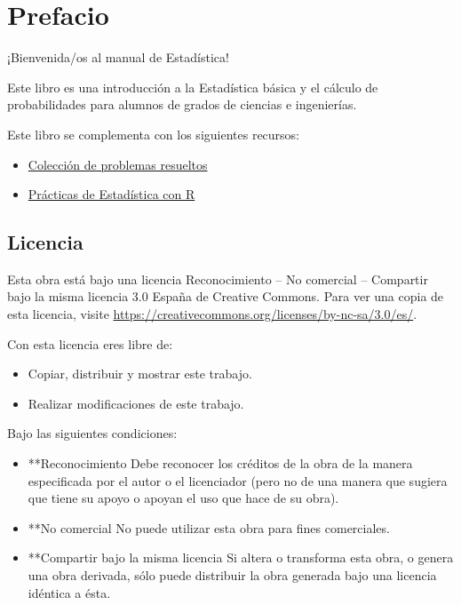 \documentclass[
  a4paper,
]{scrreport}
\providecommand{\tightlist}{%
  \setlength{\itemsep}{0pt}\setlength{\parskip}{0pt}}\usepackage{longtable,booktabs,array}
\renewcommand*\contentsname{Indice de contenidos}
\newcommand\contentsname{Indice de contenidos}
\theoremstyle{plain}
\theoremstyle{definition}
\theoremstyle{definition}
\theoremstyle{remark}
\begin{document}
\renewcommand*\contentsname{Indice de contenidos}
{
\hypersetup{linkcolor=}
\setcounter{tocdepth}{2}
\tableofcontents
}

\hypertarget{prefacio}{%
\chapter*{Prefacio}\label{prefacio}}


¡Bienvenida/os al manual de Estadística!

Este libro es una introducción a la Estadística básica y el cálculo de
probabilidades para alumnos de grados de ciencias e ingenierías.

Este libro se complementa con los siguientes recursos:

\begin{itemize}
\tightlist
\item
  \href{https://aprendeconalf.es/estadistica-ejercicios/}{Colección de
  problemas resueltos}
\item
  \href{https://aprendeconalf.es/estadistica-practicas-r/}{Prácticas de
  Estadística con R}
\end{itemize}

\hypertarget{licencia}{%
\section*{Licencia}\label{licencia}}


Esta obra está bajo una licencia Reconocimiento -- No comercial --
Compartir bajo la misma licencia 3.0 España de Creative Commons. Para
ver una copia de esta licencia, visite
\url{https://creativecommons.org/licenses/by-nc-sa/3.0/es/}.

Con esta licencia eres libre de:

\begin{itemize}
\tightlist
\item
  Copiar, distribuir y mostrar este trabajo.
\item
  Realizar modificaciones de este trabajo.
\end{itemize}

Bajo las siguientes condiciones:

\begin{itemize}
\item
  **Reconocimiento Debe reconocer los créditos de la obra de la manera
  especificada por el autor o el licenciador (pero no de una manera que
  sugiera que tiene su apoyo o apoyan el uso que hace de su obra).
\item
  **No comercial No puede utilizar esta obra para fines comerciales.
\item
  **Compartir bajo la misma licencia Si altera o transforma esta obra, o
  genera una obra derivada, sólo puede distribuir la obra generada bajo
  una licencia idéntica a ésta.
\end{itemize}
\end{document}
